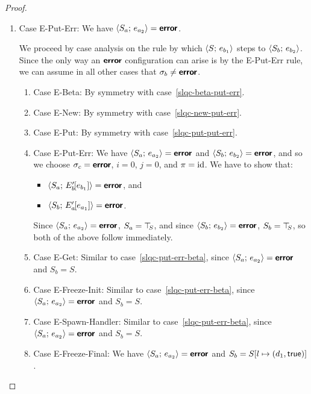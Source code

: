 \begin{proof}
\begin{enumerate}
\begin{enumerate}
    \end{enumerate}
  \item Case {\sc E-Put-Err}: We have $\langle S_a;\, e_{a_2} \rangle =
    \textbf{\textsf{error}}$.

    We proceed by case analysis on the rule by which
    $\langle S;\, e_{b_1} \rangle$ steps to $\langle S_b;\, e_{b_2} \rangle$.  Since the
    only way an $\textbf{\textsf{error}}$ configuration can arise is by the {\sc
      E-Put-Err} rule, we can assume in all other cases that $\sigma_b
    \neq \textbf{\textsf{error}}$.
    \begin{enumerate}
    \item \label{slqc-put-err-beta}Case {\sc E-Beta}: By symmetry with case~\ref{slqc-beta-put-err}.
    \item \label{slqc-put-err-new}Case {\sc E-New}: By symmetry with case~\ref{slqc-new-put-err}.
    \item \label{slqc-put-err-put}Case {\sc E-Put}: By symmetry with case~\ref{slqc-put-put-err}.
    \item \label{slqc-put-err-put-err}Case {\sc E-Put-Err}: We have
      $\langle S_a;\, e_{a_2} \rangle = \textbf{\textsf{error}}$ and $\langle S_b;\, e_{b_2} \rangle =
      \textbf{\textsf{error}}$, and so we choose $\sigma_c = \textbf{\textsf{error}}$, $i = 0$, $j = 0$,
      and $\pi = \mathrm{id}$.  We have to show that:
      \begin{itemize}
      \item $\langle S_a;\, E'_b\hspace{-1mm}\left[e_{b_1}\right] \rangle = \textbf{\textsf{error}}$, and
      \item
        $\langle S_b;\, E'_a\hspace{-1mm}\left[e_{a_1}\right] \rangle = \textbf{\textsf{error}}$.
      \end{itemize}

      Since $\langle S_a;\, e_{a_2} \rangle = \textbf{\textsf{error}}$, $S_a = \top\hspace{-0.85mm}_{S}$, and since
      $\langle S_b;\, e_{b_2} \rangle = \textbf{\textsf{error}}$, $S_b = \top\hspace{-0.85mm}_{S}$, so both of the
      above follow immediately.

    \item \label{slqc-put-err-get}Case {\sc E-Get}: Similar to
      case~\ref{slqc-put-err-beta}, since $\langle S_a;\, e_{a_2} \rangle =
      \textbf{\textsf{error}}$ and $S_b = S$.
    \item \label{slqc-put-err-freeze-init}Case {\sc E-Freeze-Init}:
      Similar to case~\ref{slqc-put-err-beta}, since
      $\langle S_a;\, e_{a_2} \rangle = \textbf{\textsf{error}}$ and $S_b = S$.
    \item \label{slqc-put-err-spawn-handler}Case {\sc
      E-Spawn-Handler}: Similar to case~\ref{slqc-put-err-beta}, since
      $\langle S_a;\, e_{a_2} \rangle = \textbf{\textsf{error}}$ and $S_b = S$.
    \item \label{slqc-put-err-freeze-final}Case {\sc E-Freeze-Final}:
      We have $\langle S_a;\, e_{a_2} \rangle = \textbf{\textsf{error}}$ and $S_b =
      S[l \mapsto (d_1, \textsf{true})]$.


\end{enumerate}
\end{enumerate}
\end{proof}
